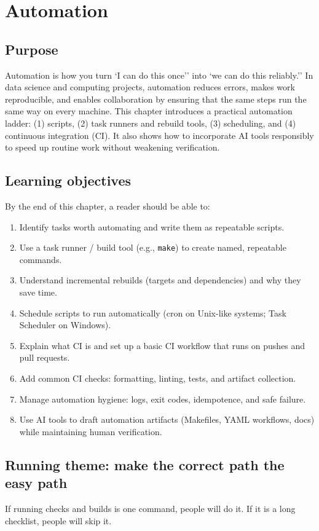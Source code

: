 \chapter{Automation}
\label{ch:automation}

\section*{Purpose}
Automation is how you turn `I can do this once'' into `we can do this reliably.'' In data science and computing projects, automation reduces errors, makes work reproducible, and enables collaboration by ensuring that the same steps run the same way on every machine. This chapter introduces a practical automation ladder: (1) scripts, (2) task runners and rebuild tools, (3) scheduling, and (4) continuous integration (CI). It also shows how to incorporate AI tools responsibly to speed up routine work without weakening verification.

\section*{Learning objectives}
By the end of this chapter, a reader should be able to:
\begin{enumerate}
\item Identify tasks worth automating and write them as repeatable scripts.
\item Use a task runner / build tool (e.g., \texttt{make}) to create named, repeatable commands.
\item Understand incremental rebuilds (targets and dependencies) and why they save time.
\item Schedule scripts to run automatically (cron on Unix-like systems; Task Scheduler on Windows).
\item Explain what CI is and set up a basic CI workflow that runs on pushes and pull requests.
\item Add common CI checks: formatting, linting, tests, and artifact collection.
\item Manage automation hygiene: logs, exit codes, idempotence, and safe failure.
\item Use AI tools to draft automation artifacts (Makefiles, YAML workflows, docs) while maintaining human verification.
\end{enumerate}

\section*{Running theme: make the correct path the easy path}
If running checks and builds is one command, people will do it. If it is a long checklist, people will skip it.

